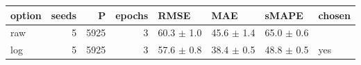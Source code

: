\begin{tabular}{lrrrllll}
\toprule
option & seeds & P & epochs & RMSE & MAE & sMAPE & chosen \\
\midrule
raw & 5 & 5925 & 3 & 60.3 $\pm$ 1.0 & 45.6 $\pm$ 1.4 & 65.0 $\pm$ 0.6 &  \\
log & 5 & 5925 & 3 & 57.6 $\pm$ 0.8 & 38.4 $\pm$ 0.5 & 48.8 $\pm$ 0.5 & yes \\
\bottomrule
\end{tabular}
